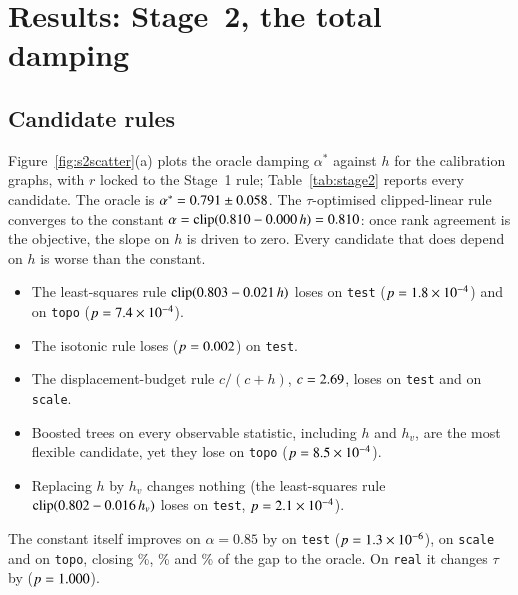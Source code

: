 \documentclass[11pt,a4paper]{article}
\theoremstyle{definition}
\theoremstyle{remark}
\newcommand{\clip}{\mathrm{clip}}
\begin{document}
\FloatBarrier
\section{Results: Stage~2, the total damping}
\label{sec:res2}

\subsection{Candidate rules}
Figure~\ref{fig:s2scatter}(a) plots the oracle damping $\alpha^*$ against $h$ for the calibration graphs,
with $r$ locked to the Stage~1 rule; Table~\ref{tab:stage2} reports every candidate. The oracle is
$\alpha^*=0.791\pm0.058$. The $\tau$-optimised clipped-linear rule converges to the
constant $\alpha=\clip(0.810-0.000\,h)=\STwoConstAlpha$: once rank agreement is the objective, the
slope on $h$ is driven to zero. Every candidate that does depend on $h$ is worse than the constant.
\begin{itemize}[leftmargin=1.4em,itemsep=0pt]
\item The least-squares rule $\clip(\STwoLSa\STwoLSb\,h)$ loses \STwoTestLSvsConst{} on \texttt{test}
($p=1.8\times10^{-4}$) and \STwoTopoLSvsConst{} on \texttt{topo} ($p=7.4\times10^{-4}$).
\item The isotonic rule loses \STwoTestIsoVsConst{} ($p=0.002$) on \texttt{test}.
\item The displacement-budget rule $c/(c+h)$, $c=2.69$, loses \STwoTestBudVsConst{} on
\texttt{test} and \STwoScaleBudVsConst{} on \texttt{scale}.
\item Boosted trees on every observable statistic, including $h$ and $h_v$, are the most flexible
candidate, yet they lose \STwoTopoGbmVsConst{} on \texttt{topo} ($p=8.5\times10^{-4}$).
\item Replacing $h$ by $h_v$ changes nothing (the least-squares rule $\clip(\STwoLSva\STwoLSvb\,h_v)$
loses \STwoTestLSvVsConst{} on \texttt{test}, $p=2.1\times10^{-4}$).
\end{itemize}
The constant itself improves on $\alpha=0.85$ by \STwoTestConstVs{} on \texttt{test} ($p=1.3\times10^{-6}$),
\STwoScaleConstVs{} on \texttt{scale} and \STwoTopoConstVs{} on \texttt{topo}, closing \STwoTestConstGap\%,
\STwoScaleConstGap\% and \STwoTopoConstGap\% of the gap to the oracle. On \texttt{real} it changes $\tau$
by \STwoRealConstVs{} ($p=1.000$).
\end{document}
